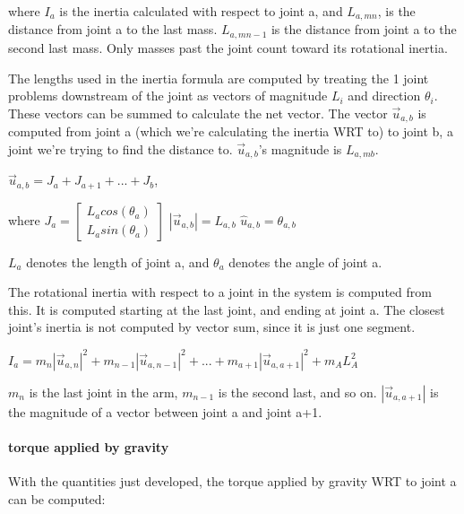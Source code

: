 \documentclass{article}
\begin{document}
\noindent \justifying where $I_a$ is the inertia calculated with respect to joint a, and $L_{a,mn}$, is the distance from joint a to the last mass. $L_{a,mn-1}$ is the distance from joint a to the second last mass. Only masses past the joint count toward its rotational inertia. 

\noindent \justifying The lengths used in the inertia formula are computed by treating the 1 joint problems downstream of the joint as  vectors of magnitude $L_i$ and direction $\theta_i$. These vectors can be summed to calculate the net vector. The vector $\vec{u}_{a,b}$ is computed from joint a (which we're calculating the inertia WRT to) to joint b, a joint we're trying to find the distance to. $\vec{u}_{a,b}$'s magnitude is $L_{a,mb}$. 

\vspace{24pt}
\centering $\vec{u}_{a,b} = J_a + J_{a+1} + ... + J_b$,
\vspace{14pt}

\indent where $J_a =  \begin{bmatrix} L_acos(\theta_a) \\ L_asin(\theta_a) \end{bmatrix}$ 
\hspace{1cm}   $|\vec{u}_{a,b}| = L_{a,b}$  \hspace{1cm} $\hat u_{a,b} = \theta_{a,b}$
\vspace{24pt}
 
$L_a$ denotes the length of joint a, and $\theta_a$ denotes the angle of joint a. 



The rotational inertia with respect to a joint in the system is computed from this. It is computed starting at the last joint, and ending at joint a. The closest joint's inertia is not computed by vector sum, since it is just one segment. 

\vspace{24pt}

\centering $I_a = m_n|\vec{u}_{a,n}|^2 + m_{n-1}|\vec{u}_{a,n-1}|^2 + ... + m_{a+1}|\vec{u}_{a,a+1}|^2 + m_AL_A^2$

\vspace{14pt}

$m_n$ is the last joint in the arm, $m_{n-1}$ is the second last, and so on. $|\vec{u}_{a,a+1}|$ is the magnitude of a vector between joint a and joint a+1.

\paragraph{torque applied by gravity} 
With the quantities just developed, the torque applied by gravity WRT to joint a can be computed:
\vspace{24pt}
\end{document}
